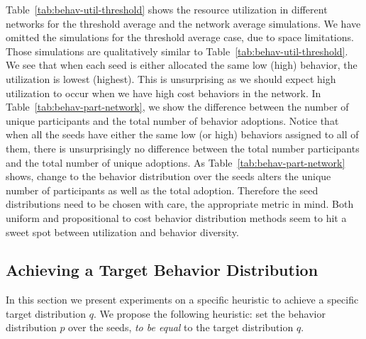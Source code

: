 \documentclass[letterpaper]{article}
\theoremstyle{plain} 		\newtheorem{thm}{Theorem}[section]
\theoremstyle{definition} 	\newtheorem{defn}[thm]{Definition}
\theoremstyle{remark}		\newtheorem{rem}{Remark}
\begin{document}


Table~\ref{tab:behav-util-threshold} shows the resource utilization in different networks for the threshold average and the network average simulations. We have omitted the simulations for the threshold average case, due to space limitations.  Those simulations are qualitatively similar to Table~\ref{tab:behav-util-threshold}. We see that when each seed is either allocated the same low (high) behavior, the utilization is lowest (highest). This is unsurprising as we should expect high utilization to occur when we have high cost behaviors in the network. In Table~\ref{tab:behav-part-network}, we show the difference between the number of unique participants and the total number of behavior adoptions. Notice that when all the seeds have either the same low (or high) behaviors assigned to all of them, there is unsurprisingly no difference between the total number participants and the total number of unique adoptions. As Table~\ref{tab:behav-part-network} shows, change to the behavior distribution over the seeds alters the unique number of participants as well as the total adoption. Therefore the seed distributions need to be chosen with care, the appropriate metric in mind. Both uniform and propositional to cost behavior distribution methods seem to hit a sweet spot between utilization and behavior diversity.

\subsection{Achieving a Target Behavior Distribution}
In this section we present experiments on a specific heuristic to achieve a specific target distribution $q$. We propose the following heuristic: set the behavior distribution $p$ over the seeds, \textit{to be equal} to the target distribution $q$.
\end{document}
